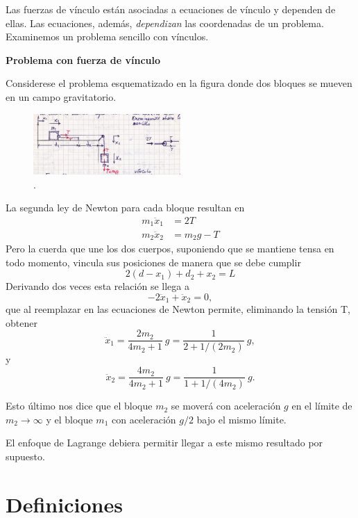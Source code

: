 \documentclass[10pt,oneside]{CBFT_book}
\begin{document}
Las fuerzas de vínculo están asociadas a ecuaciones de vínculo y dependen de ellas. Las ecuaciones, además, {\it 
dependizan} las coordenadas de un problema. Examinemos un problema sencillo con vínculos.

\begin{ejemplo}{\bfseries Problema con fuerza de vínculo }

\label{problema_fuerza_vinculo}
Considerese el problema esquematizado en la figura donde dos bloques se mueven en un campo gravitatorio.
\begin{figure}[!ht]
	\centering
	\includegraphics[width=0.5\textwidth]{images/fig_mc_problema_bloques.jpg}	
	\caption{.}
	\label{fig_mc_problema_bloques}
\end{figure} 
La segunda ley de Newton para cada bloque resultan en
\begin{align*}
	m_1 \ddot{x}_1 &= 2T \\
	m_2 \ddot{x}_2 &= m_2 g - T
\end{align*}
Pero la cuerda que une los dos cuerpos, suponiendo que se mantiene tensa en todo momento, vincula sus posiciones de 
manera que se debe cumplir 
\[
	2(d-x_1) + d_2 + x_2 = L
\]
Derivando dos veces esta relación se llega a
\[
	- 2\ddot{x}_1 + \ddot{x}_2 = 0,
\]
que al reemplazar en las ecuaciones de Newton permite, eliminando la tensión T, obtener
\[
	\ddot{x}_1 = \frac{2 m_2}{4m_2 + 1} \: g = \frac{1}{2 + 1/(2m_2)} \: g ,
\]
y
\[
	\ddot{x}_2 = \frac{4 m_2}{4m_2 + 1} \: g = \frac{1}{1 + 1/(4m_2)} \: g.
\]

Esto último nos dice que el bloque $m_2$ se moverá con aceleración $g$ en el límite de $m_2 \to \infty$ y el bloque
$m_1$ con aceleración $g/2$ bajo el mismo límite. 
\end{ejemplo}

El enfoque de Lagrange debiera permitir llegar a este mismo resultado por supuesto.


\section{Definiciones}
\end{document}
